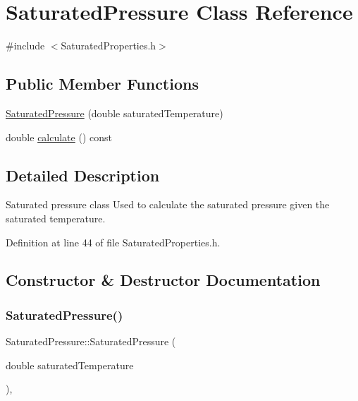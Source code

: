 \hypertarget{class_saturated_pressure}{}\section{Saturated\+Pressure Class Reference}
\label{class_saturated_pressure}


{\ttfamily \#include $<$Saturated\+Properties.\+h$>$}

\subsection*{Public Member Functions}
\begin{DoxyCompactItemize}
\item 
\hyperlink{class_saturated_pressure_a67020b0bb7588c643e12e256fa25e0bc}{Saturated\+Pressure} (double saturated\+Temperature)
\item 
double \hyperlink{class_saturated_pressure_a8ef5357b4f8af1aeaa8dde6ae05b9daa}{calculate} () const
\end{DoxyCompactItemize}


\subsection{Detailed Description}
Saturated pressure class Used to calculate the saturated pressure given the saturated temperature. 

Definition at line 44 of file Saturated\+Properties.\+h.



\subsection{Constructor \& Destructor Documentation}
\mbox{\label{class_saturated_pressure_a67020b0bb7588c643e12e256fa25e0bc}} 
\subsubsection{\texorpdfstring{Saturated\+Pressure()}{SaturatedPressure()}}
{\footnotesize\ttfamily Saturated\+Pressure\+::\+Saturated\+Pressure (\begin{DoxyParamCaption}\item[{double}]{saturated\+Temperature }\end{DoxyParamCaption})\hspace{0.3cm}{\ttfamily [inline]}, {\ttfamily [explicit]}}

